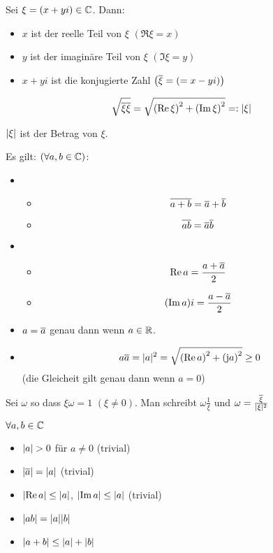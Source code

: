 \begin{Def}
  Sei $\xi=(x+yi)\in\mathbb{C}$. Dann:
  \begin{itemize}
    \item $x$ ist der reelle Teil von $\xi$ $(\Re\xi=x)$
    \item $y$ ist der imaginäre Teil von $\xi$ $(\Im\xi=y)$
    \item $x+yi$ ist die konjugierte Zahl $\left( \overline{\xi}=\left( =x-yi \right) \right)$
  \end{itemize}
\end{Def}
\begin{Bew}
  \[\sqrt{\overline{\xi}\overline{\xi}}=\sqrt{\left( \operatorname{Re}\xi \right)^2+\left( \operatorname{Im}\xi \right)^2}=:\mathopen| \xi \mathclose|\]
\end{Bew}
\begin{Def}
  $\mathopen| \xi \mathclose|$ ist der Betrag von $\xi$.
\end{Def}
\begin{Sat}
  Es gilt: $(\forall a,b\in\mathbb{C})$:
  \begin{itemize}
    \item 
      \begin{itemize}
        \item \[\overline{a+b}=\overline{a}+\overline{b}\]
        \item \[\overline{ab}=\overline{a}\overline{b}\]
      \end{itemize}
    \item 
      \begin{itemize}
        \item \[\operatorname{Re} a =\frac{a+\overline{a}}{2}\]
        \item \[(\operatorname{Im} a) i=\frac{a-\overline{a}}{2}\]
      \end{itemize}
    \item $a=\overline{a}$ genau dann wenn $a\in\mathbb{R}$.
    \item \[a\ol a=\abs{a}^2=\sqrt{\left( \Re a \right)^2+\left( \im a \right)^2}\geq 0\]
      (die Gleicheit gilt genau dann wenn $a=0$)
  \end{itemize}
\end{Sat}
\begin{Bem}
  Sei $\omega$ so dass $\xi\omega=1$ $(\xi\neq 0)$. Man schreibt $\omega\frac{1}{\xi}$ und $\omega=\frac{\overline{\xi}}{\mathopen| \xi \mathclose|^2}$
\end{Bem}
\begin{Sat}
  $\forall a,b\in\mathbb{C}$
  \begin{itemize}
    \item $\abs{a}>0$ für $a\neq 0$ (trivial)
    \item $\mathopen| \overline{a} \mathclose|=\mathopen| a \mathclose|$ (trivial)
    \item $\mathopen| \operatorname{Re} a \mathclose|\leq\mathopen| a \mathclose|$, $\mathopen| \operatorname{Im} a \mathclose|\leq\mathopen| a \mathclose|$ (trivial)
    \item $\mathopen| ab \mathclose|=\mathopen| a \mathclose|\mathopen| b \mathclose|$
    \item $\mathopen| a+b \mathclose|\leq\mathopen| a \mathclose|+\mathopen| b \mathclose|$
  \end{itemize}
\end{Sat}
